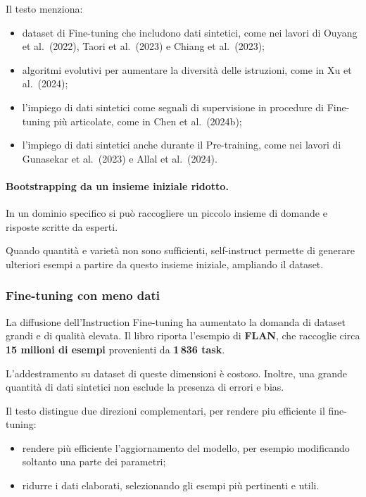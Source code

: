 Il testo menziona:

\begin{itemize}
    \item dataset di Fine-tuning che includono dati sintetici,
    come nei lavori di Ouyang et al.\ (2022),
    Taori et al.\ (2023) e Chiang et al.\ (2023);

    \item algoritmi evolutivi per aumentare
    la diversità delle istruzioni,
    come in Xu et al.\ (2024);

    \item l'impiego di dati sintetici come segnali
    di supervisione in procedure di Fine-tuning
    più articolate, come in Chen et al.\ (2024b);

    \item l'impiego di dati sintetici anche
    durante il Pre-training, come nei lavori
    di Gunasekar et al.\ (2023)
    e Allal et al.\ (2024).
\end{itemize}

\paragraph{Bootstrapping da un insieme iniziale ridotto.}
In un dominio specifico si può raccogliere
un piccolo insieme di domande e risposte
scritte da esperti.

Quando quantità e varietà non sono sufficienti,
self-instruct permette di generare ulteriori esempi
a partire da questo insieme iniziale,
ampliando il dataset.


\newpage
\subsubsection{Fine-tuning con meno dati}

La diffusione dell'Instruction Fine-tuning ha aumentato
la domanda di dataset grandi e di qualità elevata.
Il libro riporta l'esempio di \textbf{FLAN},
che raccoglie circa \textbf{15 milioni di esempi}
provenienti da \textbf{1\,836 task}.

L'addestramento su dataset di queste dimensioni
è costoso. Inoltre, una grande quantità
di dati sintetici non esclude la presenza
di errori e bias.

Il testo distingue due direzioni complementari, per rendere piu efficiente il fine-tuning:

\begin{itemize}
    \item rendere più efficiente l'aggiornamento del modello,
    per esempio modificando soltanto una parte
    dei parametri;

    \item ridurre i dati elaborati, selezionando
    gli esempi più pertinenti e utili.
\end{itemize}

